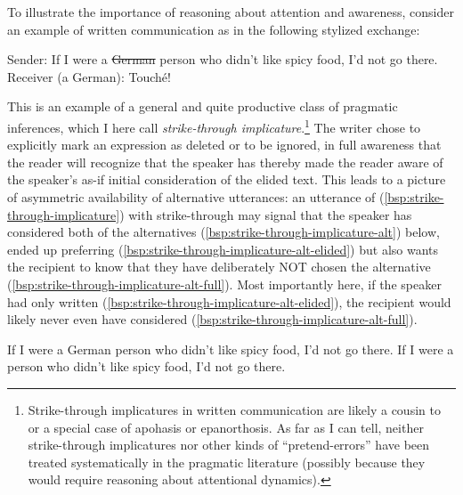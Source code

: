 \documentclass[fleqn,reqno,12pt]{article}
\begin{document}
To illustrate the importance of reasoning about attention and awareness, consider an example of written communication as in the following stylized exchange:
%
\begin{exe}
  \ex \label{bsp:strike-through-implicature}
  Sender: If I were a \st{German} person who didn't like spicy food, I’d not go there.\\
  Receiver (a German): Touché!
\end{exe}
%
This is an example of a general and quite productive class of pragmatic inferences, which I here call \emph{strike-through implicature}.\footnote{
  Strike-through implicatures in written communication are likely a cousin to or a special case of apohasis or epanorthosis.
  As far as I can tell, neither strike-through implicatures nor other kinds of ``pretend-errors'' have been treated systematically in the pragmatic literature (possibly because they would require reasoning about attentional dynamics).
}
The writer chose to explicitly mark an expression as deleted or to be ignored, in full awareness that the reader will recognize that the speaker has thereby made the reader aware of the speaker's as-if initial consideration of the elided text.
This leads to a picture of asymmetric availability of alternative utterances: an utterance of (\ref{bsp:strike-through-implicature}) with strike-through may signal that the speaker has considered both of the alternatives (\ref{bsp:strike-through-implicature-alt}) below, ended up preferring (\ref{bsp:strike-through-implicature-alt-elided}) but also wants the recipient to know that they have deliberately NOT chosen the alternative (\ref{bsp:strike-through-implicature-alt-full}).
Most importantly here, if the speaker had only written (\ref{bsp:strike-through-implicature-alt-elided}), the recipient would likely never even have considered (\ref{bsp:strike-through-implicature-alt-full}).
%
\begin{exe}
  \ex \label{bsp:strike-through-implicature-alt}
  \begin{xlist}
    \ex \label{bsp:strike-through-implicature-alt-full}
     If I were a German person who didn't like spicy food, I’d not go there.
     \ex \label{bsp:strike-through-implicature-alt-elided}
     If I were a person who didn't like spicy food, I’d not go there.
  \end{xlist}
\end{exe}
\end{document}
